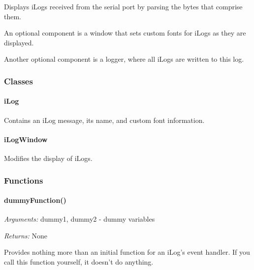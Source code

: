 \documentclass[12pt,letterpaper]{article}
\begin{document}
Displays iLogs received from the serial port by parsing the bytes that comprise them.

An optional component is a window that sets custom fonts for iLogs as they are displayed.

Another optional component is a logger, where all iLogs are written to this log.

\setcounter{subsubsection}{-1}



%
%
\subsubsection{Classes}
\label{4.6.0}

\setcounter{paragraph}{-1}



%
%
\paragraph{iLog}
\label{4.6.0.0}

Contains an iLog message, its name, and custom font information.



%
%
\paragraph{iLogWindow}
\label{4.6.0.1}

Modifies the display of iLogs.



%
%
\subsubsection{Functions}
\label{4.6.1}

\setcounter{paragraph}{-1}



%
%
\paragraph{dummyFunction()}
\label{4.6.1.0}

\emph{Arguments:} dummy1, dummy2 - dummy variables

\emph{Returns:} None

Provides nothing more than an initial function for an iLog's event handler. If you call this function yourself, it doesn't do anything.
\end{document}
